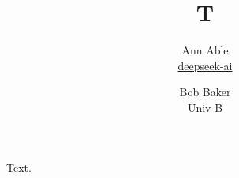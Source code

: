 \documentclass{article}
\title{T}
\author{Ann Able \\ \href{https://www.deepseek.com}{deepseek-ai} \and Bob Baker \\ Univ B}
\begin{document}
\maketitle
Text.
\end{document}
